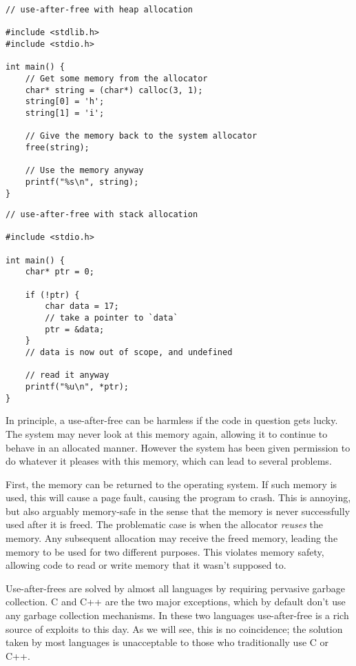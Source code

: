 \begin{verbatim}
// use-after-free with heap allocation

#include <stdlib.h>
#include <stdio.h>

int main() {
    // Get some memory from the allocator
    char* string = (char*) calloc(3, 1);
    string[0] = 'h';
    string[1] = 'i';

    // Give the memory back to the system allocator
    free(string);

    // Use the memory anyway
    printf("%s\n", string);
}

\end{verbatim}

\begin{verbatim}
// use-after-free with stack allocation

#include <stdio.h>

int main() {
    char* ptr = 0;

    if (!ptr) {
        char data = 17;
        // take a pointer to `data`
        ptr = &data;
    }
    // data is now out of scope, and undefined

    // read it anyway
    printf("%u\n", *ptr);
}
\end{verbatim}

In principle, a use-after-free can be harmless if the code in question gets lucky.
The system may never look at this memory again, allowing it to continue to
behave in an allocated manner. However the system has been given permission
to do whatever it pleases with this memory, which can lead to several problems.

First, the memory can be returned to the operating system. If such memory is
used, this will cause a page fault, causing the program to crash.
This is annoying, but also arguably memory-safe in the sense that the memory
is never successfully used after it is freed. The problematic case is when the
allocator \emph{reuses} the memory. Any subsequent allocation may receive the
freed memory, leading the memory to be used for two different purposes. This
violates memory safety, allowing code to read or write memory that it wasn't
supposed to.

Use-after-frees are solved by almost all languages by requiring
pervasive garbage collection. C and C++ are the two major exceptions, which
by default don't use any garbage collection mechanisms. In these two languages
use-after-free is a rich source of exploits to this day. As we will
see, this is no coincidence; the solution taken by most languages is
unacceptable to those who traditionally use C or C++.

